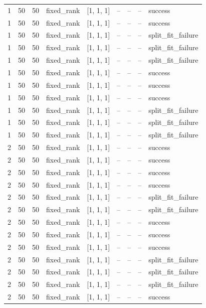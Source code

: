 \begin{longtable}{lllllllll}
1 & 50 & 50 & fixed\_rank & [1, 1, 1] & -- & -- & -- & success \\
1 & 50 & 50 & fixed\_rank & [1, 1, 1] & -- & -- & -- & success \\
1 & 50 & 50 & fixed\_rank & [1, 1, 1] & -- & -- & -- & split\_fit\_failure \\
1 & 50 & 50 & fixed\_rank & [1, 1, 1] & -- & -- & -- & split\_fit\_failure \\
1 & 50 & 50 & fixed\_rank & [1, 1, 1] & -- & -- & -- & split\_fit\_failure \\
1 & 50 & 50 & fixed\_rank & [1, 1, 1] & -- & -- & -- & success \\
1 & 50 & 50 & fixed\_rank & [1, 1, 1] & -- & -- & -- & success \\
1 & 50 & 50 & fixed\_rank & [1, 1, 1] & -- & -- & -- & success \\
1 & 50 & 50 & fixed\_rank & [1, 1, 1] & -- & -- & -- & split\_fit\_failure \\
1 & 50 & 50 & fixed\_rank & [1, 1, 1] & -- & -- & -- & split\_fit\_failure \\
1 & 50 & 50 & fixed\_rank & [1, 1, 1] & -- & -- & -- & split\_fit\_failure \\
2 & 50 & 50 & fixed\_rank & [1, 1, 1] & -- & -- & -- & success \\
2 & 50 & 50 & fixed\_rank & [1, 1, 1] & -- & -- & -- & success \\
2 & 50 & 50 & fixed\_rank & [1, 1, 1] & -- & -- & -- & success \\
2 & 50 & 50 & fixed\_rank & [1, 1, 1] & -- & -- & -- & success \\
2 & 50 & 50 & fixed\_rank & [1, 1, 1] & -- & -- & -- & split\_fit\_failure \\
2 & 50 & 50 & fixed\_rank & [1, 1, 1] & -- & -- & -- & split\_fit\_failure \\
2 & 50 & 50 & fixed\_rank & [1, 1, 1] & -- & -- & -- & success \\
2 & 50 & 50 & fixed\_rank & [1, 1, 1] & -- & -- & -- & success \\
2 & 50 & 50 & fixed\_rank & [1, 1, 1] & -- & -- & -- & success \\
2 & 50 & 50 & fixed\_rank & [1, 1, 1] & -- & -- & -- & split\_fit\_failure \\
2 & 50 & 50 & fixed\_rank & [1, 1, 1] & -- & -- & -- & split\_fit\_failure \\
2 & 50 & 50 & fixed\_rank & [1, 1, 1] & -- & -- & -- & split\_fit\_failure \\
2 & 50 & 50 & fixed\_rank & [1, 1, 1] & -- & -- & -- & success \\

\end{longtable}
